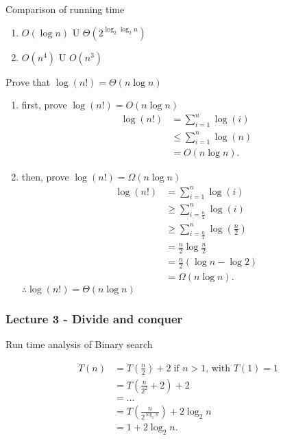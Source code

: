 \documentclass[../../main/main.tex]{subfiles}
\begin{document}
\begin{theorem}
	Comparison of running time
	\begin{enumerate}
		\item $O(\log n)$ U $\Theta(2^{\log_{2}\log_{2} n} )$
		\item $O(n^{4})$ U $O(n^{3})$
	\end{enumerate}
\end{theorem}
\begin{exercise}
	Prove that $\log(n!) = \Theta(n\log n)$
	\begin{enumerate}
		\item first, prove $\log(n!) = O(n\log n)$
		      \begin{align*}
			      \log(n!) & =  \sum^{n}_{i=1} \log(i)   \\
			               & \le \sum^{n}_{i=1}  \log(n) \\
			               & = O(n\log n)
			      .\end{align*}
		\item then, prove $\log(n!) = \Omega(n\log n)$
		      \begin{align*}
			      \log(n!) & =  \sum^{n}_{i=1} \log(i)                       \\
			               & \ge \sum^{n}_{i=\frac{n}{2}}  \log(i)           \\
			               & \ge \sum^{n}_{i=\frac{n}{2}}  \log(\frac{n}{2}) \\
			               & = \frac{n}{2}\log \frac{n}{2}                   \\
			               & = \frac{n}{2}(\log n - \log2)                   \\
			               & = \Omega(n\log n)
			      .\end{align*}
		      $\therefore \log(n!) = \Theta(n\log n)$
	\end{enumerate}
\end{exercise}
\newpage
\subsubsection{Lecture 3 - Divide and conquer}
\begin{theorem}
	Run time analysis of Binary search

	\begin{align*}
		T(n) & = T(\frac{n}{2}) + 2  \; \text{if $n > 1$, with $T(1) = 1$} \\
		     & = T(\frac{n}{2^2} + 2) + 2                                  \\
		     & = \ldots                                                    \\
		     & = T(\frac{n}{2^{\log_{2}n}})  + 2\log_2n                    \\
		     & = 1 + 2\log_{2}n
		.\end{align*}
\end{theorem}
\end{document}
